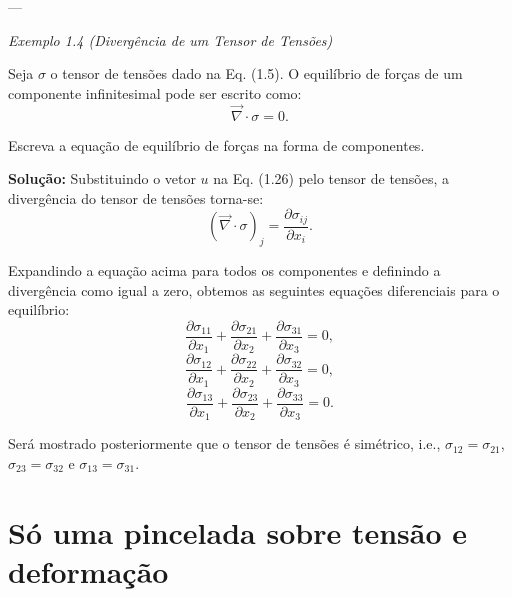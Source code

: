 {	---
	
	\emph{Exemplo 1.4 (Divergência de um Tensor de Tensões)}
	
	Seja $\sigma$ o tensor de tensões dado na Eq. (1.5). O equilíbrio de forças de um componente infinitesimal pode ser escrito como:
	\begin{equation}
		\vec{\nabla} \cdot \sigma = 0.
	\end{equation}
	
	Escreva a equação de equilíbrio de forças na forma de componentes.
	
	\textbf{Solução:} Substituindo o vetor $u$ na Eq. (1.26) pelo tensor de tensões, a divergência do tensor de tensões torna-se:
	\begin{equation}
		(\vec{\nabla} \cdot \sigma)_j = \frac{\partial \sigma_{ij}}{\partial x_i}.
	\end{equation}
	
	Expandindo a equação acima para todos os componentes e definindo a divergência como igual a zero, obtemos as seguintes equações diferenciais para o equilíbrio:
	\begin{equation}
		\frac{\partial \sigma_{11}}{\partial x_1} + \frac{\partial \sigma_{21}}{\partial x_2} + \frac{\partial \sigma_{31}}{\partial x_3} = 0,
	\end{equation}
	\begin{equation}
		\frac{\partial \sigma_{12}}{\partial x_1} + \frac{\partial \sigma_{22}}{\partial x_2} + \frac{\partial \sigma_{32}}{\partial x_3} = 0,
	\end{equation}
	\begin{equation}
		\frac{\partial \sigma_{13}}{\partial x_1} + \frac{\partial \sigma_{23}}{\partial x_2} + \frac{\partial \sigma_{33}}{\partial x_3} = 0.
	\end{equation}
	
	Será mostrado posteriormente que o tensor de tensões é simétrico, i.e., $\sigma_{12} = \sigma_{21}$, $\sigma_{23} = \sigma_{32}$ e $\sigma_{13} = \sigma_{31}$.
}
\section{Só uma pincelada sobre tensão e deformação}

